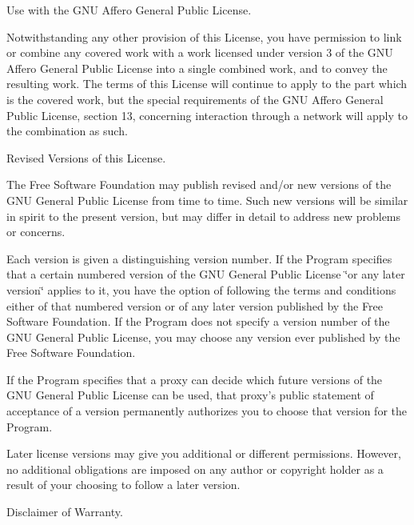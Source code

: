 \begin{DoxyEnumerate}
\item Use with the G\-N\-U Affero General Public License.
\end{DoxyEnumerate}

Notwithstanding any other provision of this License, you have permission to link or combine any covered work with a work licensed under version 3 of the G\-N\-U Affero General Public License into a single combined work, and to convey the resulting work. The terms of this License will continue to apply to the part which is the covered work, but the special requirements of the G\-N\-U Affero General Public License, section 13, concerning interaction through a network will apply to the combination as such.


\begin{DoxyEnumerate}
\item Revised Versions of this License.
\end{DoxyEnumerate}

The Free Software Foundation may publish revised and/or new versions of the G\-N\-U General Public License from time to time. Such new versions will be similar in spirit to the present version, but may differ in detail to address new problems or concerns.

Each version is given a distinguishing version number. If the Program specifies that a certain numbered version of the G\-N\-U General Public License \char`\"{}or any later version\char`\"{} applies to it, you have the option of following the terms and conditions either of that numbered version or of any later version published by the Free Software Foundation. If the Program does not specify a version number of the G\-N\-U General Public License, you may choose any version ever published by the Free Software Foundation.

If the Program specifies that a proxy can decide which future versions of the G\-N\-U General Public License can be used, that proxy's public statement of acceptance of a version permanently authorizes you to choose that version for the Program.

Later license versions may give you additional or different permissions. However, no additional obligations are imposed on any author or copyright holder as a result of your choosing to follow a later version.


\begin{DoxyEnumerate}
\item Disclaimer of Warranty.
\end{DoxyEnumerate}

